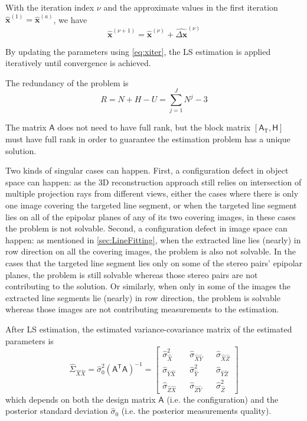 With the iteration index $\nu$ and the approximate values in the first iteration $\widehat{\boldsymbol x}^{(1)}=\widehat{\boldsymbol x}^{(a)}$, we have
\begin{equation}\label{eq:xiter}
	\widehat{\boldsymbol x}^{(\nu+1)}=
	\widehat{\boldsymbol x}^{(\nu)}+
	\widehat{\Delta\boldsymbol x}^{(\nu)}
\end{equation}

By updating the parameters using \cref{eq:xiter}, the LS estimation is applied iteratively until convergence is achieved. 


The redundancy of the problem is
\begin{equation}
R=N+H-U=\displaystyle\sum_{j=1}^{J}N^j-3
\end{equation}

The matrix $\mathsf{A}$ does not need to have full rank, but the block matrix $[\mathsf{A_T},\mathsf{H}]$ must have full rank in order to guarantee the estimation problem has a unique solution.


\clearpage
Two kinds of singular cases can happen. First, a configuration defect in object space can happen: as the 3D reconstruction approach still relies on intersection of multiple projection rays from different views, either the cases where there is only one image covering the targeted line segment, or when the targeted line segment lies on all of the epipolar planes of any of its two covering images, in these cases the problem is not solvable. Second, a configuration defect in image space can happen: as mentioned in \cref{sec:LineFitting}, when the extracted line lies (nearly) in row direction on all the covering images, the problem is also not solvable. In the cases that the targeted line segment lies only on some of the stereo pairs' epipolar planes, the problem is still solvable whereas those stereo pairs are not contributing to the solution. Or similarly, when only in some of the images the extracted line segments lie (nearly) in row direction, the problem is solvable whereas those images are not contributing measurements to the estimation.




After LS estimation, the estimated variance-covariance matrix of the estimated parameters is
\begin{equation}
\hat{\Sigma}_{\hat{X}\hat{X}}=\hat{\sigma}_0^2(\mathsf{A^TA})^{-1}=
\begin{bmatrix}
\hat{\sigma}_{\hat{X}}^2 && \hat{\sigma}_{\hat{X}\hat{Y}} && \hat{\sigma}_{\hat{X}\hat{Z}} \\
\hat{\sigma}_{\hat{Y}\hat{X}} && \hat{\sigma}_{\hat{Y}}^2 && \hat{\sigma}_{\hat{Y}\hat{Z}} \\
\hat{\sigma}_{\hat{Z}\hat{X}} && \hat{\sigma}_{\hat{Z}\hat{Y}} && \hat{\sigma}_{\hat{Z}}^2
\end{bmatrix}
\end{equation}
which depends on both the design matrix $\mathsf{A}$ (i.e. the configuration) and the posterior standard deviation $\hat{\sigma}_0$ (i.e. the posterior measurements quality).




